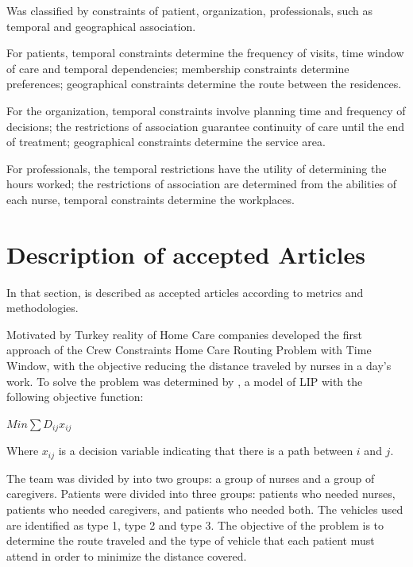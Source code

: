 Was classified by  constraints of patient, organization, professionals, such as temporal and geographical association. 

For patients, temporal constraints determine the frequency of visits,  time window of care and temporal dependencies; membership constraints determine preferences; geographical constraints determine the route between the residences.

For the organization, temporal constraints involve planning time and frequency of decisions; the restrictions of association guarantee continuity of care until the end of treatment; geographical constraints determine the service area. 

For professionals, the temporal restrictions have the utility of determining the hours worked; the restrictions of association are determined from the abilities of each nurse, temporal constraints determine the workplaces.

\section{Description of accepted Articles}

In that section, is described as accepted articles according to metrics and methodologies.

Motivated by Turkey reality of Home Care companies   developed the first approach of the Crew Constraints Home Care Routing Problem with Time Window, with the objective reducing the distance traveled by nurses in a day's work. To solve the problem was determined by  , a model of \ac{LIP} with the following objective function:

\begin{center}
$Min \sum D_{ij}x_{ij}$
\end{center}

Where $x_{ij}$ is a decision variable indicating that there is a path between $i$ and $j$.

The team was divided by  into two groups: a group of nurses and a group of caregivers. Patients were divided into three groups: patients who needed nurses, patients who needed caregivers, and patients who needed both.
The vehicles used are identified as type 1, type 2 and type 3.
The objective of the problem is to determine the route traveled and the type of vehicle that each patient must attend in order to minimize the distance covered.

